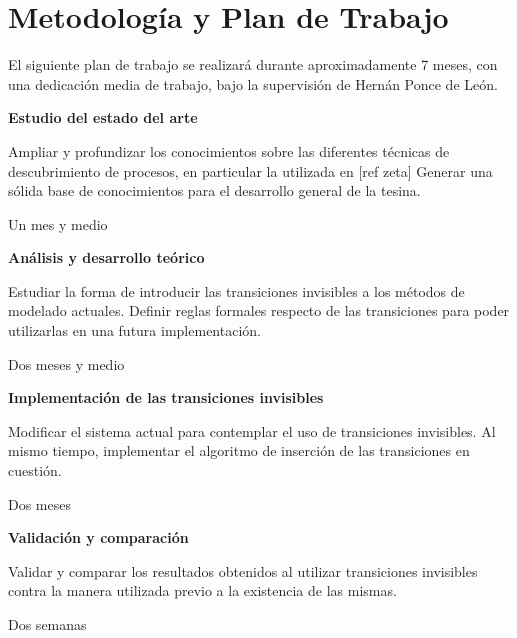 \documentclass{llncs}
\begin{document}
\section{Metodología y Plan de Trabajo}

El siguiente plan de trabajo se realizará durante aproximadamente 7 meses, con una dedicación media de trabajo, bajo la supervisión de Hernán Ponce de León.

\bigskip \noindent
\textbf{Estudio del estado del arte}
  \begin{description}[style=multiline,leftmargin=2.5cm,font=\normalfont]
    \item[\textit{Objetivos}]
       Ampliar y profundizar los conocimientos sobre las diferentes técnicas de descubrimiento de procesos, en particular la utilizada en [ref zeta]
       Generar una sólida base de conocimientos para el desarrollo general de la tesina.
    \item[\textit{Dedicación}]
       Un mes y medio
  \end{description}

\bigskip \noindent
\textbf{Análisis y desarrollo teórico}
  \begin{description}[style=multiline,leftmargin=2.5cm,font=\normalfont]
    \item[\textit{Objetivos}]
       Estudiar la forma de introducir las transiciones invisibles a los métodos de modelado actuales. Definir reglas formales respecto de las transiciones para poder utilizarlas
       en una futura implementación.
    \item[\textit{Dedicación}]
       Dos meses y medio
  \end{description}

\bigskip \noindent
\textbf{Implementación de las transiciones invisibles}
  \begin{description}[style=multiline,leftmargin=2.5cm,font=\normalfont]
    \item[\textit{Objetivos}]
       Modificar el sistema actual para contemplar el uso de transiciones invisibles. Al mismo
       tiempo, implementar el algoritmo de inserción de las transiciones en cuestión.
    \item[\textit{Dedicación}]
       Dos meses
  \end{description}

\bigskip \noindent
\textbf{Validación y comparación}
  \begin{description}[style=multiline,leftmargin=2.5cm,font=\normalfont]
    \item[\textit{Objetivos}]
       Validar y comparar los resultados obtenidos al utilizar transiciones invisibles contra la manera utilizada previo a la existencia de las mismas.
    \item[\textit{Dedicación}]
       Dos semanas
  \end{description}




\end{document}

